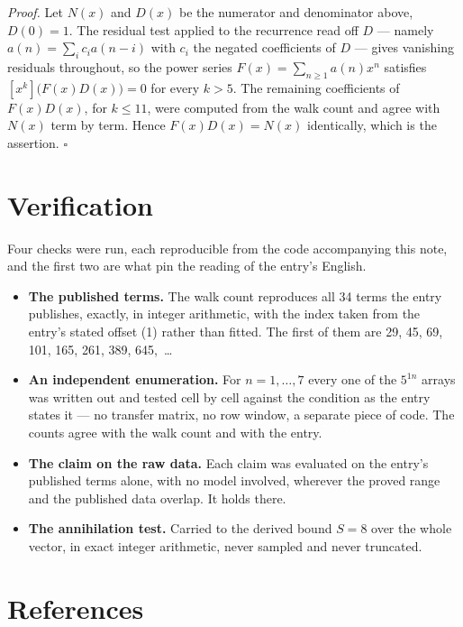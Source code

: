\documentclass[11pt]{article}
\theoremstyle{definition}
\begin{document}
{\itshape Proof.} Let $N(x)$ and $D(x)$ be the numerator and denominator above, $D(0)=1$. The residual test applied to the recurrence read off $D$ --- namely $a(n) = \sum_i c_i a(n-i)$ with $c_i$ the negated coefficients of $D$ --- gives vanishing residuals throughout, so the power series $F(x)=\sum_{n\ge 1}a(n)x^n$ satisfies $[x^k]\bigl(F(x)D(x)\bigr) = 0$ for every $k > 5$. The remaining coefficients of $F(x)D(x)$, for $k \le 11$, were computed from the walk count and agree with $N(x)$ term by term. Hence $F(x)D(x) = N(x)$ identically, which is the assertion. $\square$

\section{Verification}

Four checks were run, each reproducible from the code accompanying this note, and the first two are what pin the reading of the entry's English.

\begin{itemize}

\item {\bfseries The published terms.} The walk count reproduces all 34 terms the entry publishes, exactly, in integer arithmetic, with the index taken from the entry's stated offset (1) rather than fitted. The first of them are 29, 45, 69, 101, 165, 261, 389, 645,~\dots

\item {\bfseries An independent enumeration.} For $n = 1,\dots,7$ every one of the $5^{1n}$ arrays was written out and tested cell by cell against the condition as the entry states it --- no transfer matrix, no row window, a separate piece of code. The counts agree with the walk count and with the entry.

\item {\bfseries The claim on the raw data.} Each claim was evaluated on the entry's published terms alone, with no model involved, wherever the proved range and the published data overlap. It holds there.

\item {\bfseries The annihilation test.} Carried to the derived bound $S = 8$ over the whole vector, in exact integer arithmetic, never sampled and never truncated.

\end{itemize}

\section{References}
\end{document}
